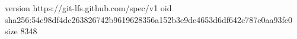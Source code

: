 version https://git-lfs.github.com/spec/v1
oid sha256:54c98df4dc263826742b9619628356a152b3e9de4653d6df642c787e0aa93fe0
size 8348
